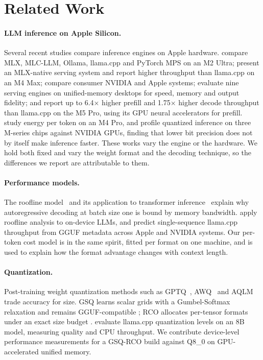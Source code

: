 \documentclass[11pt]{article}
\begin{document}
\section{Related Work}

\paragraph{LLM inference on Apple Silicon.}
Several recent studies compare inference engines on Apple hardware.
\citet{rajesh2025production} compare MLX, MLC-LLM, Ollama, llama.cpp and PyTorch MPS on an
M2 Ultra; \citet{barrios2026native} present an MLX-native serving system and report higher
throughput than llama.cpp on an M4 Max; \citet{javat2026silicon} compare consumer NVIDIA and
Apple systems; \citet{zhang2026siliconbench} evaluate nine serving engines on unified-memory
desktops for speed, memory and output fidelity; and \citet{waschkowski2026basert} report
up to 6.4$\times$ higher prefill and 1.75$\times$ higher decode throughput than llama.cpp on the
M5 Pro, using its GPU neural accelerators for prefill. \citet{kannan2026greenbench} study energy
per token on an M4 Pro, and \citet{benazir2025profiling} profile quantized inference on three
M-series chips against NVIDIA GPUs, finding that lower bit precision does not by itself make
inference faster.
These works vary the engine or the hardware. We hold both fixed and vary the weight format
and the decoding technique, so the differences we report are attributable to them.

\paragraph{Performance models.}
The roofline model~\cite{williams2009roofline} and its application to transformer
inference~\cite{pope2023scaling} explain why autoregressive decoding at batch size one is
bound by memory bandwidth. \citet{bi2026rooflinebench} apply roofline analysis to on-device
LLMs, and \citet{qiu2026ggufmeta} predict single-sequence llama.cpp throughput from GGUF
metadata across Apple and NVIDIA systems. Our per-token cost model is in the same spirit,
fitted per format on one machine, and is used to explain how the format advantage changes
with context length.

\paragraph{Quantization.}
Post-training weight quantization methods such as GPTQ~\cite{frantar2023gptq},
AWQ~\cite{lin2024awq} and AQLM~\cite{egiazarian2024aqlm} trade accuracy for size. GSQ
learns scalar grids with a Gumbel-Softmax relaxation and remains GGUF-compatible
\cite{dadgarnia2026gsq}; RCO allocates per-tensor formats under an exact size budget
\cite{helcig2026rco}. \citet{kurt2026quant} evaluate llama.cpp quantization levels on an 8B
model, measuring quality and CPU throughput. We contribute device-level performance
measurements for a GSQ-RCO build against Q8\_0 on GPU-accelerated unified memory.
\end{document}
